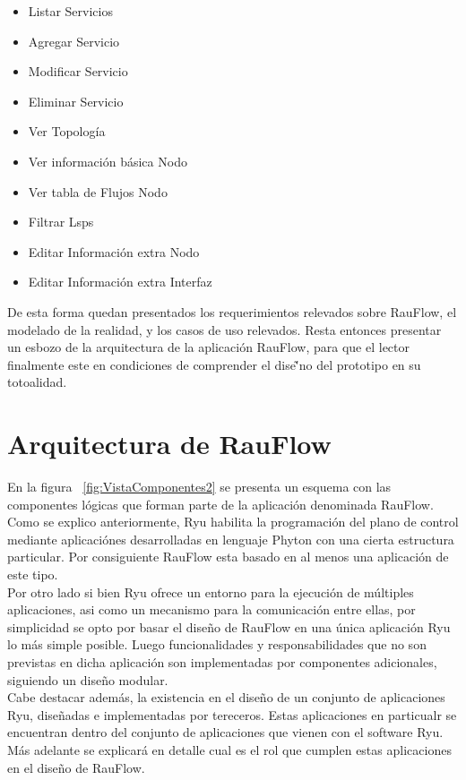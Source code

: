 \begin{itemize}
\item Listar Servicios
\item Agregar Servicio
\item Modificar Servicio
\item Eliminar Servicio
\item Ver Topolog\'ia
\item Ver informaci\'on b\'asica Nodo
\item Ver tabla de Flujos Nodo
\item Filtrar Lsps
\item Editar Informaci\'on extra Nodo
\item Editar Informaci\'on extra Interfaz
\end{itemize}

De esta forma quedan presentados los requerimientos relevados sobre RauFlow, el modelado de la realidad, y los casos de uso relevados. Resta entonces presentar un esbozo de la arquitectura de la aplicaci\'on RauFlow, para que el lector finalmente este en condiciones de comprender el dise\~'no del prototipo en su totoalidad.

\section[Arquitectura de RauFlow]{Arquitectura de RauFlow}

En la figura ~\ref{fig:VistaComponentes2} se presenta un esquema con las componentes l\'ogicas que forman parte de la aplicaci\'on denominada RauFlow. Como se explico anteriormente, Ryu habilita la programaci\'on del plano de control mediante aplicaci\'ones desarrolladas en lenguaje Phyton con una cierta estructura particular. Por consiguiente RauFlow esta basado en al menos una aplicaci\'on de este tipo.\\

Por otro lado si bien Ryu ofrece un entorno para la ejecuci\'on de m\'ultiples aplicaciones, asi como un mecanismo para la comunicaci\'on entre ellas, por simplicidad se opto por basar el dise\~no de RauFlow en una \'unica aplicaci\'on Ryu lo m\'as simple posible. Luego funcionalidades y responsabilidades que no son previstas en dicha aplicaci\'on son implementadas por componentes adicionales, siguiendo un dise\~no modular.\\

Cabe destacar adem\'as, la existencia en el dise\~no de un conjunto de aplicaciones Ryu, dise\~nadas e implementadas por tereceros. Estas aplicaciones en particualr se encuentran dentro del conjunto de aplicaciones que vienen con el software Ryu. M\'as adelante se explicar\'a en detalle cual es el rol que cumplen estas aplicaciones en el dise\~no de RauFlow.\\

